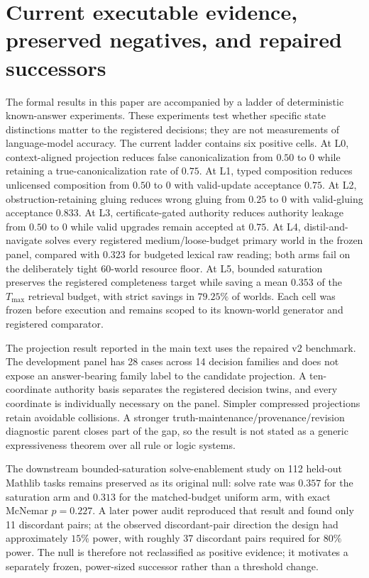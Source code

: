 \section{Current executable evidence, preserved negatives, and repaired successors}\label{app:current-evidence}

The formal results in this paper are accompanied by a ladder of deterministic known-answer experiments. These experiments test whether specific state distinctions matter to the registered decisions; they are not measurements of language-model accuracy. The current ladder contains six positive cells. At L0, context-aligned projection reduces false canonicalization from $0.50$ to $0$ while retaining a true-canonicalization rate of $0.75$. At L1, typed composition reduces unlicensed composition from $0.50$ to $0$ with valid-update acceptance $0.75$. At L2, obstruction-retaining gluing reduces wrong gluing from $0.25$ to $0$ with valid-gluing acceptance $0.833$. At L3, certificate-gated authority reduces authority leakage from $0.50$ to $0$ while valid upgrades remain accepted at $0.75$. At L4, distil-and-navigate solves every registered medium/loose-budget primary world in the frozen panel, compared with $0.323$ for budgeted lexical raw reading; both arms fail on the deliberately tight $60$-world resource floor. At L5, bounded saturation preserves the registered completeness target while saving a mean $0.353$ of the $T_{\max}$ retrieval budget, with strict savings in $79.25\%$ of worlds. Each cell was frozen before execution and remains scoped to its known-world generator and registered comparator.

The projection result reported in the main text uses the repaired v2 benchmark. The development panel has 28 cases across 14 decision families and does not expose an answer-bearing family label to the candidate projection. A ten-coordinate authority basis separates the registered decision twins, and every coordinate is individually necessary on the panel. Simpler compressed projections retain avoidable collisions. A stronger truth-maintenance/provenance/revision diagnostic parent closes part of the gap, so the result is not stated as a generic expressiveness theorem over all rule or logic systems.

The downstream bounded-saturation solve-enablement study on 112 held-out Mathlib tasks remains preserved as its original null: solve rate was $0.357$ for the saturation arm and $0.313$ for the matched-budget uniform arm, with exact McNemar $p=0.227$. A later power audit reproduced that result and found only 11 discordant pairs; at the observed discordant-pair direction the design had approximately $15\%$ power, with roughly 37 discordant pairs required for $80\%$ power. The null is therefore not reclassified as positive evidence; it motivates a separately frozen, power-sized successor rather than a threshold change.

